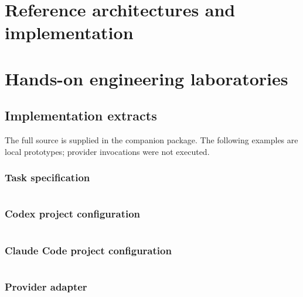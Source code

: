 \documentclass[11pt,oneside,openany]{book}
\begin{document}




\part{Reference architectures and implementation}







\part{Hands-on engineering laboratories}





\appendix\chapter{Implementation extracts}

The full source is supplied in the companion package. The following examples are local prototypes; provider invocations were not executed.

\section{Task specification}\inputminted[fontsize=\small,breaklines,breakanywhere]{json}{examples/task.json}

\section{Codex project configuration}\inputminted[fontsize=\small,breaklines,breakanywhere]{toml}{examples/.codex/config.toml}

\section{Claude Code project configuration}\inputminted[fontsize=\small,breaklines,breakanywhere]{json}{examples/.claude/settings.json}

\section{Provider adapter}\inputminted[fontsize=\small,breaklines,breakanywhere]{python}{examples/orchestrate.py}
\end{document}
